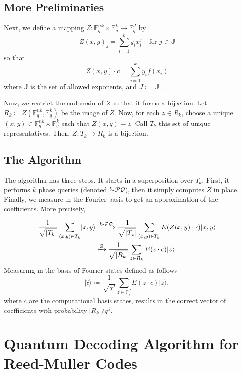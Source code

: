 \documentclass[12pt,twoside]{reedthesis}
\theoremstyle{definition}
\newlength{\arrow}
\newcommand{\F}{\mathbb{F}}
\newcommand{\ket}[1]{\ensuremath{\lvert #1\rangle}\xspace}
\begin{document}
\section{More Preliminaries}
Next, we define a mapping $Z: \F_q^{nk} \times \F_q^{k} \rightarrow \F_q^{J}$ by 
\begin{equation*}
Z(x,y)_j = \sum_{i = 1}^k y_ix_i^j \quad \text{for }j \in \mathbb{J}
\end{equation*}
so that
\begin{equation*}
Z(x,y) \cdot c = \sum_{i=1}^k y_i f(x_i)
\end{equation*}
where $\mathbb{J}$ is the set of allowed exponents, and $J \coloneqq \lvert \mathbb{J} \rvert$.

Now, we restrict the codomain of $Z$ so that it forms a bijection. Let $R_k \coloneqq Z(\F_q^{nk}, \F_q^k)$ be the image of $Z$. Now, for each $z \in R_k$, choose a unique $(x,y) \in \F_q^{nk} \times \F_q^{k}$ such that $Z(x,y) = z$. Call $T_k$ this set of unique representatives. Then, $Z: T_k \rightarrow R_k$ is a bijection.

\section{The Algorithm}
The algorithm has three steps. It starts in a superposition over $T_k$. First, it performs $k$ phase queries (denoted $k$-$\mathcal{PQ}$), then it simply computes $Z$ in place. Finally, we measure in the Fourier basis to get an approximation of the coefficients. More precisely,

\begin{align*}
\frac{1}{\sqrt{\lvert T_k \rvert}} \sum_{(x,y)\in T_k} \ket{x,y} 
& \xmapsto{k\text{-}\mathcal{PQ}} \frac{1}{\sqrt{\lvert T_k \rvert}} \sum_{(x,y)\in T_k} E(Z(x,y) \cdot c) \ket{x,y} \\
& \xmapsto{Z} \frac{1}{\sqrt{\lvert R_k \rvert}} \sum_{z\in R_k} E(z \cdot c) \ket{z}. 
\end{align*}
Measuring in the basis of Fourier states defined as follows
\begin{equation*}
\ket{\hat{c}} \coloneqq \frac{1}{\sqrt{q^J}} \sum_{z \in \F_q^J} E(z \cdot c) \ket{z},
\end{equation*}
where $c$ are the computational basis states, results in the correct vector of coefficients with probability $\lvert R_k \rvert / q^J$.


\chapter{Quantum Decoding Algorithm for Reed-Muller Codes}
\end{document}
